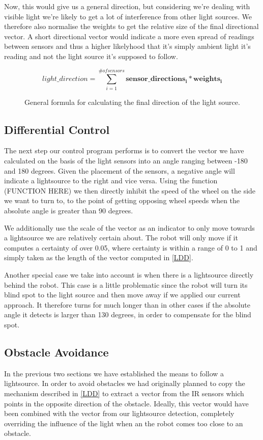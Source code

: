 \documentclass[paper=a4, fontsize=12pt]{scrartcl}	%
\numberwithin{equation}{section}		%
\numberwithin{figure}{section}			%
\numberwithin{table}{section}				%
\begin{document}
Now, this would give us a general direction, but considering we're dealing with visible light we're likely to get a lot of interference from other light sources. We therefore also normalise the weights to get the relative size of the final directional vector. A short directional vector would indicate a more even spread of readings between sensors and thus a higher likelyhood that it's simply ambient light it's reading and not the light source it's supposed to follow.

\begin{figure}[h!]
\label{dir_formula}
\[
  light\_direction = \sum_{i=1}^{\# of sensors} \mathbf{sensor\_directions_i}*\mathbf{weights_i}
\]
\caption{General formula for calculating the final direction of the light source.}
\end{figure}

\subsection{Differential Control}
The next step our control program performs is to convert the vector we have calculated on the basis of the light sensors into an angle ranging between -180 and 180 degrees. Given the placement of the sensors, a negative angle will indicate a lightsource to the right and vice versa. Using the function (FUNCTION HERE) we then directly inhibit the speed of the wheel on the side we want to turn to, to the point of getting opposing wheel speeds when the absolute angle is greater than 90 degrees.

We additionally use the scale of the vector as an indicator to only move towards a lightsource we are relatively certain about. The robot will only move if it computes a certainty of over 0.05, where certainty is within a range of 0 to 1 and simply taken as the length of the vector computed in \ref{LDD}.

Another special case we take into account is when there is a lightsource directly behind the robot. This case is a little problematic since the robot will turn its blind spot to the light source and then move away if we applied our current approach. It therefore turns for much longer than in other cases if the absolute angle it detects is larger than 130 degrees, in order to compensate for the blind spot.
\subsection{Obstacle Avoidance}
In the previous two sections we have established the means to follow a lightsource. In order to avoid obstacles we had originally planned to copy the mechanism described in \ref{LDD} to extract a vector from the IR sensors which points in the opposite direction of the obstacle. Ideally, this vector would have been combined with the vector from our lightsource detection, completely overriding the influence of the light when an the robot comes too close to an obstacle.
\end{document}
